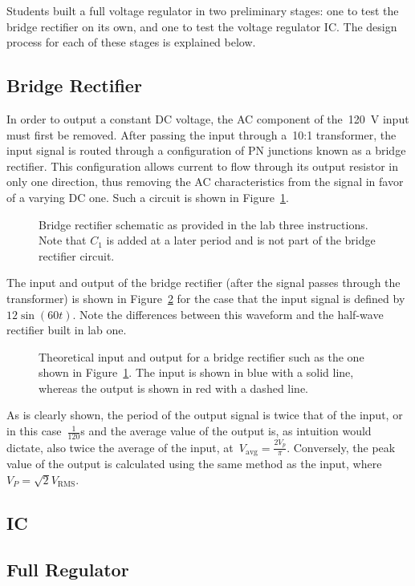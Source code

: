 Students built a full voltage regulator in two preliminary stages: one to test
the bridge rectifier on its own, and one to test the voltage regulator IC.  The
design process for each of these stages is explained below.

\subsection{Bridge Rectifier}
In order to output a constant DC voltage, the AC component of
the~\SI{120}{\volt} input must first be removed.  After passing the input
through a~10:1 transformer, the input signal is routed through a configuration
of PN junctions known as a bridge rectifier.  This configuration allows current
to flow through its output resistor in only one direction, thus removing the AC
characteristics from the signal in favor of a varying DC one.  Such a circuit
is shown in Figure~\ref{fig:bridgeSchem}.
%
\begin{figure}[H]
	\centering
	
	\parbox{.6\textwidth}{
	\caption{Bridge rectifier schematic as provided in the lab three
	instructions.  Note that $C_1$ is added at a later period and is not part
	of the bridge rectifier circuit.}
	\label{fig:bridgeSchem}}
\end{figure}
%
The input and output of the bridge rectifier (after the signal passes through the transformer) is shown
in Figure~\ref{fig:bridgeRectOut} for the case that the input signal is defined
by~$12 \sin(60t)$.  Note the differences between this waveform and the
half-wave rectifier built in lab one.
%
\begin{figure}[H]
	\centering
	
	\parbox{.6\textwidth}{
	\caption{Theoretical input and output for a bridge rectifier such as the
	one shown in Figure~\ref{fig:bridgeSchem}.  The input is shown in blue with
	a solid line, whereas the output is shown in red with a dashed line.}
	\label{fig:bridgeRectOut}
	}
\end{figure}
%
As is clearly shown, the period of the output signal is twice that of the
input, or in this case~$\frac{1}{120}$\si{\second} and the average value of the
output is, as intuition would dictate, also twice the average of the input,
at~$V_\text{avg} = \frac{2 V_p}{\pi}$.  Conversely, the peak value of the
output is calculated using the same method as the input,
where~$V_P=\sqrt{2}V_\mathrm{RMS}$.


\subsection{IC}
\begin{figure}[H]
	\centering
	
\end{figure}

\subsection{Full Regulator}
\begin{figure}[H]
	\centering
	
\end{figure}
